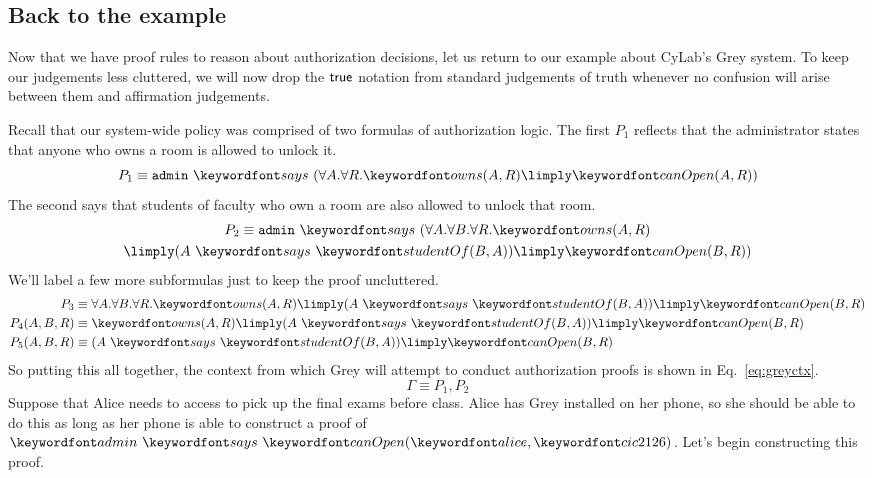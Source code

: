 \documentclass[11pt,twoside]{scrartcl}
\begin{document}
\subsection{Back to the example}

Now that we have proof rules to reason about authorization decisions, let us return to our example about CyLab's Grey system. To keep our judgements less cluttered, we will now drop the $\mathsf{true}$ notation from standard judgements of truth whenever no confusion will arise between them and affirmation judgements.

Recall that our system-wide policy was comprised of two formulas of authorization logic. The first $P_1$ reflects that the administrator states that anyone who owns a room is allowed to unlock it.
\[
P_1 \equiv \says{\mathtt{admin}}{(\forall A.\forall R. \ownsr(A,R) \limply \canopen(A,R))}
\]
The second says that students of faculty who own a room are also allowed to unlock that room.
\begin{multline*}
P_2 \equiv \says{\mathtt{admin}}{(\forall A.\forall B.\forall R. \ownsr(A,R) \\ \limply (\says{A}{\studof(B,A)}) \limply \canopen(B,R))}
\end{multline*}
We'll label a few more subformulas just to keep the proof uncluttered.
\begin{align*}
P_3 &\equiv \forall A.\forall B.\forall R. \ownsr(A,R) \limply (\says{A}{\studof(B,A)}) \limply \canopen(B,R) \\
P_4(A,B,R) &\equiv \ownsr(A,R) \limply (\says{A}{\studof(B,A)}) \limply \canopen(B,R) \\
P_5(A,B,R) &\equiv (\says{A}{\studof(B,A)}) \limply \canopen(B,R)
\end{align*}
So putting this all together, the context from which Grey will attempt to conduct authorization proofs is shown in Eq.~\ref{eq:greyctx}.
\begin{equation}
\label{eq:greyctx}
\Gamma \equiv P_1,P_2
\end{equation}
Suppose that Alice needs to access \office to pick up the final exams before class. Alice has Grey installed on her phone, so she should be able to do this as long as her phone is able to construct a proof of $\says{\admin}{\canopen(\tli,\office)}$. Let's begin constructing this proof. 
\end{document}
